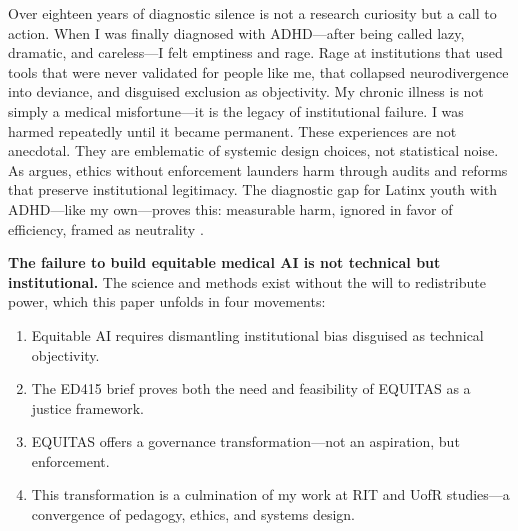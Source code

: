 \documentclass[12pt,a4paper]{article}
\begin{document}
Over eighteen years of diagnostic silence is not a research curiosity but a call to action. When I was finally diagnosed with ADHD—after being called lazy, dramatic, and careless—I felt emptiness and rage. Rage at institutions that used tools that were never validated for people like me, that collapsed neurodivergence into deviance, and disguised exclusion as objectivity. My chronic illness is not simply a medical misfortune—it is the legacy of institutional failure. I was harmed repeatedly until it became permanent. These experiences are not anecdotal. They are emblematic of systemic design choices, not statistical noise. As \citet{Munn2023} argues, ethics without enforcement launders harm through audits and reforms that preserve institutional legitimacy. The diagnostic gap for Latinx youth with ADHD—like my own—proves this: measurable harm, ignored in favor of efficiency, framed as neutrality \citep{Marko2025, Sagona2025}.

\vspace{0.5em}
\noindent\textbf{The failure to build equitable medical AI is not technical but institutional.} The science and methods exist without the will to redistribute power, which this paper unfolds in four movements:
\begin{enumerate}
    \setlength\itemsep{0.1em}
  \item Equitable AI requires dismantling institutional bias disguised as technical objectivity.
  \item The ED415 brief proves both the need and feasibility of EQUITAS as a justice framework.
  \item EQUITAS offers a governance transformation—not an aspiration, but enforcement.
  \item This transformation is a culmination of my work at RIT and UofR studies—a convergence of pedagogy, ethics, and systems design.
\end{enumerate}
\end{document}

